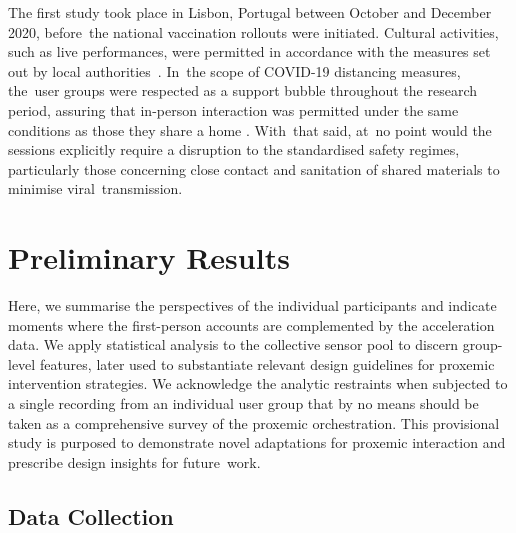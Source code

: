 The first study took place in Lisbon, Portugal between October and December 2020, before~the national vaccination rollouts were initiated. Cultural activities, such as live performances, were permitted in accordance with the measures set out by local authorities~\cite{direcao-geral_da_saude_dgs_covid-19_2020}. In~the scope of COVID-19 distancing measures, the~user groups were respected as a support bubble throughout the research period, assuring that in-person interaction was permitted under the same conditions as those they share a home \citep{trotter_ways_2021}. With~that said, at~no point would the sessions explicitly require a disruption to the standardised safety regimes, particularly those concerning close contact and sanitation of shared materials to minimise viral~transmission.


\section{Preliminary Results}
\label{sec:results}

Here, we summarise the perspectives of the individual participants and indicate moments where the first-person accounts are complemented by the acceleration data. We apply statistical analysis to the collective sensor pool to discern group-level features, later used to substantiate relevant design guidelines for proxemic intervention strategies. We acknowledge the analytic restraints when subjected to a single recording from an individual user group that by no means should be taken as a comprehensive survey of the proxemic orchestration. This provisional study is purposed to demonstrate novel adaptations for proxemic interaction and prescribe design insights for future~work.


\subsection*{Data Collection}
\label{sec:data_collection}

